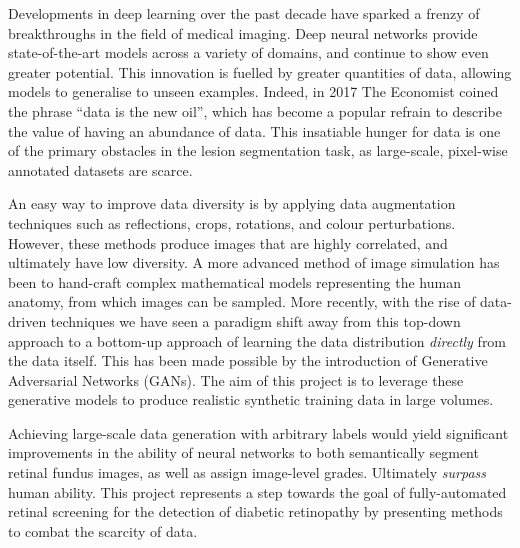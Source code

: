 Developments in deep learning over the past decade have sparked a frenzy of breakthroughs in the field of medical imaging. Deep neural networks provide state-of-the-art models across a variety of domains, and continue to show even greater potential. This innovation is fuelled by greater quantities of data, allowing models to generalise to unseen examples. Indeed, in 2017 The Economist coined the phrase ``data is the new oil'', which has become a popular refrain to describe the value of having an abundance of data. This insatiable hunger for data is one of the primary obstacles in the lesion segmentation task, as large-scale, pixel-wise annotated datasets are scarce.


An easy way to improve data diversity is by applying data augmentation techniques such as reflections, crops, rotations, and colour perturbations. However, these methods produce images that are highly correlated, and ultimately have low diversity. A more advanced method of image simulation has been to hand-craft complex mathematical models representing the human anatomy, from which images can be sampled. More recently, with the rise of data-driven techniques we have seen a paradigm shift away from this top-down approach to a bottom-up approach of learning the data distribution \emph{directly} from the data itself. This has been made possible by the introduction of Generative Adversarial Networks (GANs). The aim of this project is to leverage these generative models to produce realistic synthetic training data in large volumes.

Achieving large-scale data generation with arbitrary labels would yield significant improvements in the ability of neural networks to both semantically segment retinal fundus images, as well as assign image-level grades. Ultimately \emph{surpass} human ability. This project represents a step towards the goal of fully-automated retinal screening for the detection of diabetic retinopathy by presenting methods to combat the scarcity of data.